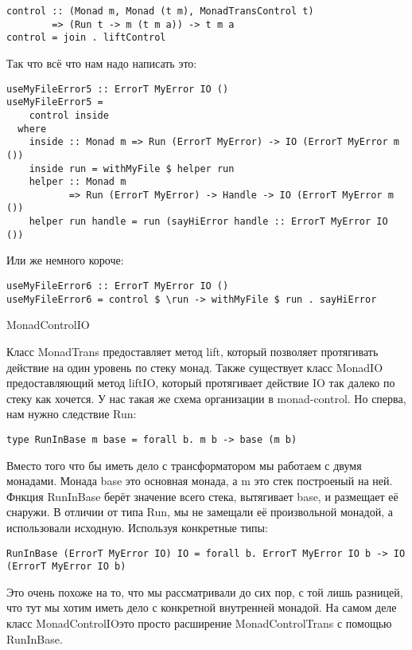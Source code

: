 \begin{lstlisting}
control :: (Monad m, Monad (t m), MonadTransControl t)
        => (Run t -> m (t m a)) -> t m a
control = join . liftControl
\end{lstlisting}

Так что всё что нам надо написать это:

\begin{lstlisting}
useMyFileError5 :: ErrorT MyError IO ()
useMyFileError5 =
    control inside
  where
    inside :: Monad m => Run (ErrorT MyError) -> IO (ErrorT MyError m ())
    inside run = withMyFile $ helper run
    helper :: Monad m
           => Run (ErrorT MyError) -> Handle -> IO (ErrorT MyError m ())
    helper run handle = run (sayHiError handle :: ErrorT MyError IO ())
\end{lstlisting}

Или же немного короче:

\begin{lstlisting}
useMyFileError6 :: ErrorT MyError IO ()
useMyFileError6 = control $ \run -> withMyFile $ run . sayHiError
\end{lstlisting}

MonadControlIO

Класс MonadTrans предоставляет метод lift, который позволяет протягивать действие на один уровень по стеку монад. Также существует класс MonadIO предоставляющий метод liftIO, который протягивает действие IO так далеко по стеку как хочется. У нас такая же схема организации в monad-control. Но сперва, нам нужно следствие Run:

\begin{lstlisting}
type RunInBase m base = forall b. m b -> base (m b)
\end{lstlisting}

Вместо того что бы иметь дело с трансформатором мы работаем с двумя монадами. Монада base это основная монада, а m это стек построеный на ней. Фнкция RunInBase берёт значение всего стека, вытягивает base, и размещает её снаружи. В отличии от типа Run, мы не замещали её произвольной монадой, а использовали исходную. Используя конкретные типы:

\begin{lstlisting}
RunInBase (ErrorT MyError IO) IO = forall b. ErrorT MyError IO b -> IO (ErrorT MyError IO b)
\end{lstlisting}

Это очень похоже на то, что мы рассматривали до сих пор, с той лишь разницей, что тут мы хотим иметь дело с конкретной внутренней монадой. На самом деле класс MonadControlIOэто просто расширение MonadControlTrans с помощью RunInBase.

